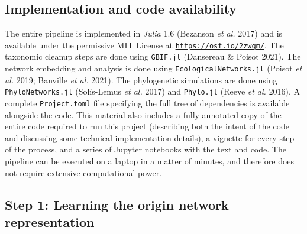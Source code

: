 \documentclass[11pt]{article}
\makeatletter
\def\maxwidth{\ifdim\Gin@nat@width>\linewidth\linewidth
\else\Gin@nat@width\fi}
\let\Oldincludegraphics\includegraphics
\renewcommand{\includegraphics}[1]{\Oldincludegraphics[width=\maxwidth]{#1}}
\providecommand{\DIFaddend}{\protect\color{black}} %
\DeclareRobustCommand{\DIFaddend}{\DIFOaddend \let\includegraphics\DIFOincludegraphics} %
\makeatother
\begin{document}
\DIFaddend \hypertarget{implementation-and-code-availability}{%
\subsection{Implementation and code
availability}\label{implementation-and-code-availability}}

The entire pipeline is implemented in \emph{Julia} 1.6 (Bezanson
\emph{et al.} 2017) and is available under the permissive MIT License at
\href{https://osf.io/2zwqm/}{\texttt{https://osf.io/2zwqm/}}. The
taxonomic cleanup steps are done using \texttt{GBIF.jl} (Dansereau \&
Poisot 2021). The network embedding and analysis is done using
\texttt{EcologicalNetworks.jl} (Poisot \emph{et al.} 2019; Banville
\emph{et al.} 2021). The phylogenetic simulations are done using
\texttt{PhyloNetworks.jl} (Solís-Lemus \emph{et al.} 2017) and
\texttt{Phylo.jl} (Reeve \emph{et al.} 2016). A complete
\texttt{Project.toml} file specifying the full tree of dependencies is
available alongside the code. This material also includes a fully
annotated copy of the entire code required to run this project
(describing both the intent of the code and discussing some technical
implementation details), a vignette for every step of the process, and a
series of Jupyter notebooks with the text and code. The pipeline can be
executed on a laptop in a matter of minutes, and therefore does not
require extensive computational power.

\hypertarget{step-1-learning-the-origin-network-representation}{%
\subsection{Step 1: Learning the origin network
representation}\label{step-1-learning-the-origin-network-representation}}
\end{document}
